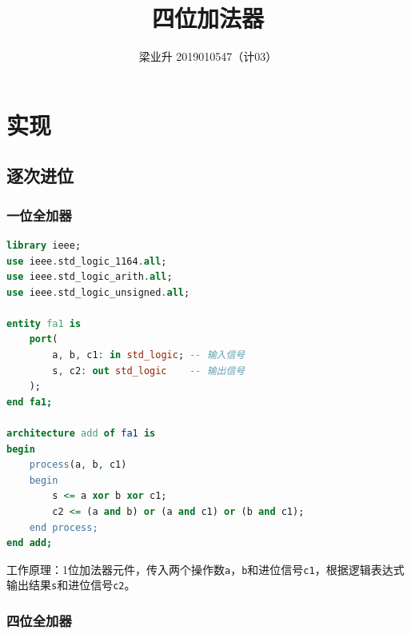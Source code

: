 \documentclass[a4paper]{article}
\begin{document}
\title{四位加法器}
\author{梁业升 2019010547（计03）}

\maketitle




\section{实现}
\subsection{逐次进位}
\subsubsection{一位全加器}

\begin{lstlisting}[language=vhdl]
library ieee;
use ieee.std_logic_1164.all;
use ieee.std_logic_arith.all;
use ieee.std_logic_unsigned.all;

entity fa1 is
    port(
        a, b, c1: in std_logic; -- 输入信号
        s, c2: out std_logic    -- 输出信号
    );
end fa1;

architecture add of fa1 is
begin
    process(a, b, c1)
    begin
        s <= a xor b xor c1;
        c2 <= (a and b) or (a and c1) or (b and c1);
    end process;
end add;
\end{lstlisting}

工作原理：1位加法器元件，传入两个操作数\texttt{a}，\texttt{b}和进位信号\texttt{c1}，根据逻辑表达式输出结果\texttt{s}和进位信号\texttt{c2}。

\subsubsection{四位全加器}
\end{document}
